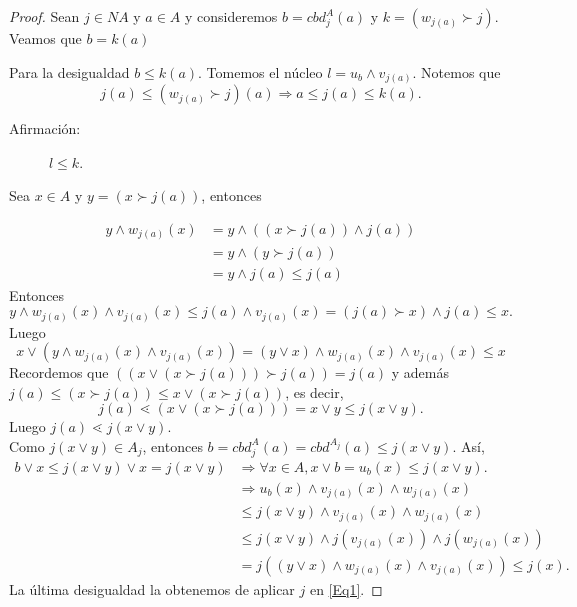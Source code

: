 \begin{proof}
Sean $j\in NA$ y $a\in A$ y consideremos $b=cbd_j^A(a)$ y $k=(w_{j(a)}\succ j)$. Veamos que $b=k(a)$

\noindent
Para la desigualdad $b\leq k(a)$. Tomemos el núcleo $l=u_b\wedge v_{j(a)}$. Notemos que $$j(a)\leq (w_{j(a)}\succ j)(a)\Rightarrow a\leq j(a)\leq k(a).$$

\begin{description}
\item[Afirmación:] $l\leq k$.
\end{description}

Sea $x\in A$ y $y=(x\succ j(a))$, entonces

\begin{equation*}
\begin{split}
y\wedge w_{j(a)}(x) &=y\wedge ((x\succ j(a))\wedge j(a))\\
& =y\wedge(y\succ j(a))\\
& =y\wedge j(a)\leq j(a)
\end{split}
\end{equation*}
Entonces $$y\wedge w_{j(a)}(x)\wedge v_{j(a)}(x)\leq j(a)\wedge v_{j(a)}(x)=(j(a)\succ x)\wedge j(a)\leq x.$$
Luego
\begin{equation}\label{Eq1}
x\vee (y\wedge w_{j(a)}(x)\wedge v_{j(a)}(x))=(y\vee x)\wedge w_{j(a)}(x)\wedge v_{j(a)}(x)\leq x
\end{equation}
Recordemos que $((x\vee (x\succ j(a)))\succ j(a))=j(a)$ y además $j(a)\leq (x\succ j(a))\leq x\vee (x\succ j(a))$, es decir,
$$j(a)\lessdot (x\vee (x\succ j(a)))=x\vee y\leq j(x\vee y).$$
Luego $j(a)\lessdot j(x\vee y).$\\
Como $j(x\vee y)\in A_j$, entonces $b=cbd_j^A(a)=cbd^{A_j}(a)\leq j(x\vee y)$. Así,
\begin{equation*}
\begin{split}
b\vee x\leq j(x\vee y)\vee x=j(x\vee y) &\Rightarrow  \forall x\in A, x\vee b=u_b(x)\leq j(x\vee y).\\
& \Rightarrow u_b(x)\wedge v_{j(a)}(x)\wedge w_{j(a)}(x)\\
& \leq j(x\vee y)\wedge v_{j(a)}(x)\wedge w_{j(a)}(x)\\ 
& \leq j(x\vee y)\wedge j(v_{j(a)}(x))\wedge j(w_{j(a)}(x))\\
& =j((y\vee x)\wedge w_{j(a)}(x)\wedge v_{j(a)}(x))\leq j(x).
\end{split}
\end{equation*}
La última desigualdad la obtenemos de aplicar $j$ en \eqref{Eq1}.


\end{proof}
